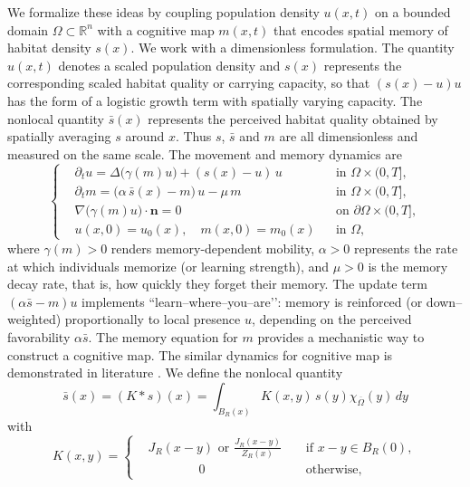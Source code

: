 \documentclass{article}
\begin{document}
We formalize these ideas by coupling population density $u(x,t)$ on a bounded domain $\Omega \subset \mathbb{R}^n$ with a cognitive map $m(x,t)$ that encodes spatial memory of habitat density $s(x)$. We work with a dimensionless formulation. The quantity $u(x,t)$ denotes a scaled population density and $s(x)$ represents the corresponding scaled habitat quality or carrying capacity, so that $(s(x)-u)u$ has the form of a logistic growth term with spatially varying capacity. The nonlocal quantity $\bar s(x)$ represents the perceived habitat quality obtained by spatially averaging $s$ around $x$. Thus $s$, $\bar s$ and $m$ are all dimensionless and measured on the same scale. The movement and memory dynamics are
\begin{equation}\label{eqn:main}
\left\{
\begin{aligned}
&\partial_t u  = \Delta\big(\gamma(m) u\big)+ (s(x)-u)\,u
&& \text{in } \Omega\times(0,T], \\[4pt]
&\partial_t m = \big(\alpha\,\bar s(x)-m\big)\,u - \mu\,m
&& \text{in } \Omega\times(0,T],\\
&\nabla\big(\gamma(m) u\big)\cdot \mathbf{n} = 0
&& \text{on } \partial\Omega\times(0,T],\\
&u(x,0) = u_0(x), \quad m(x,0) = m_0(x)
&& \text{in } \Omega,
\end{aligned}
\right.
\end{equation}
where $\gamma(m)>0$ renders memory-dependent mobility, $\alpha>0$ represents the rate at which individuals memorize (or learning strength), and $\mu>0$ is the memory decay rate, that is, how quickly they forget their memory.
The update term $(\alpha\bar{s}-m)u$ implements ``learn--where--you--are’’: memory is reinforced (or down–weighted) proportionally to local presence $u$, depending on the perceived favorability $\alpha\bar{s}$. The memory equation for $m$ provides a mechanistic way to construct a cognitive map. The similar dynamics for cognitive map is demonstrated in literature \cite{Liu2025, Wang2023}. We define the nonlocal quantity
\begin{equation}\label{bars}
\bar{s}(x)=(K*s)(x)=\int_{B_R(x)}K(x,y)\,s(y)\chi_{\overline{\Omega}}(y)\,dy 
\end{equation}
with
\begin{equation}\label{defkernel}K(x,y) = \left\{\begin{aligned}
    &J_R(x-y) \text{ or }\frac{J_R(x-y)}{Z_R(x)} &&\text{ if } x-y\in B_R(0),\\
    &\qquad\qquad 0&& \text{ otherwise, }
\end{aligned}\right. 
\end{equation}
\end{document}

